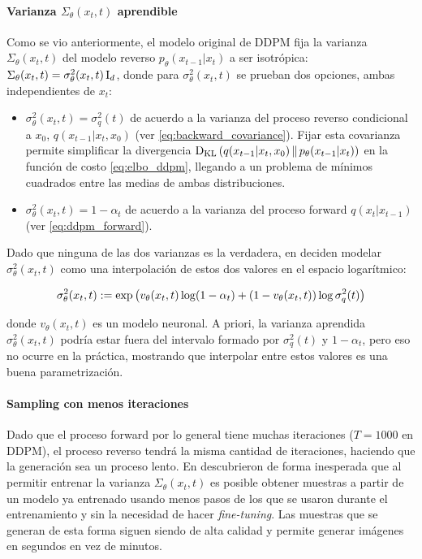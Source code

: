 \paragraph{Varianza \texorpdfstring{$\Sigma_\theta(x_t,t)$}{} aprendible}

Como se vio anteriormente, el modelo original de DDPM \cite{ho2020denoising} fija la varianza $\Sigma_\theta(x_t,t)$ del modelo reverso $p_\theta(x_{t-1}|x_{t})$ a ser isotrópica: $\Sigma_\theta(x_t,t) = \sigma^2_\theta(x_t,t) \operatorname{I}_{d}$, donde para $\sigma^2_\theta(x_t,t)$ se prueban dos opciones, ambas independientes de $x_t$:

\begin{itemize}
    \item $\sigma^2_\theta(x_t,t) = \sigma_q^2(t)$ de acuerdo a la varianza del proceso reverso condicional a $x_0$, $q(x_{t-1}|x_t,x_0)$ (ver \eqref{eq:backward_covariance}). Fijar esta covarianza permite simplificar la divergencia $\operatorname{D_{KL}}\left(q(x_{t-1}|x_t,x_0)\,\|\,p_\theta(x_{t-1}|x_t)\right)$ en la función de costo \eqref{eq:elbo_ddpm}, llegando a un problema de mínimos cuadrados entre las medias de ambas distribuciones.
    \item $\sigma^2_\theta(x_t,t) = 1-\alpha_t$ de acuerdo a la varianza del proceso forward $q(x_t|x_{t-1})$ (ver \eqref{eq:ddpm_forward}).
\end{itemize}

Dado que ninguna de las dos varianzas es la verdadera, en \cite{nichol2021improved} deciden modelar $\sigma^2_\theta(x_t,t)$ como una interpolación de estos dos valores en el espacio logarítmico:

\begin{equation*}
    \sigma^2_\theta(x_t,t):= \exp\left(v_\theta(x_t,t)\log (1-\alpha_t) + (1-v_\theta(x_t,t))\log \sigma^2_q(t)\right)
\end{equation*}

donde $v_\theta(x_t,t)$ es un modelo neuronal. A priori, la varianza aprendida $\sigma^2_\theta(x_t,t)$ podría estar fuera del intervalo formado por $\sigma_q^2(t)$ y $1-\alpha_t$, pero eso no ocurre en la práctica, mostrando que interpolar entre estos valores es una buena parametrización.

\paragraph{Sampling con menos iteraciones}

Dado que el proceso forward por lo general tiene muchas iteraciones ($T=1000$ en DDPM), el proceso reverso tendrá la misma cantidad de iteraciones, haciendo que la generación sea un proceso lento. En \cite{nichol2021improved} descubrieron de forma inesperada que al permitir entrenar la varianza $\Sigma_\theta(x_t,t)$ es posible obtener muestras a partir de un modelo ya entrenado usando menos pasos de los que se usaron durante el entrenamiento y sin la necesidad de hacer \textit{fine-tuning}. Las muestras que se generan de esta forma siguen siendo de alta calidad y permite generar imágenes en segundos en vez de minutos.

